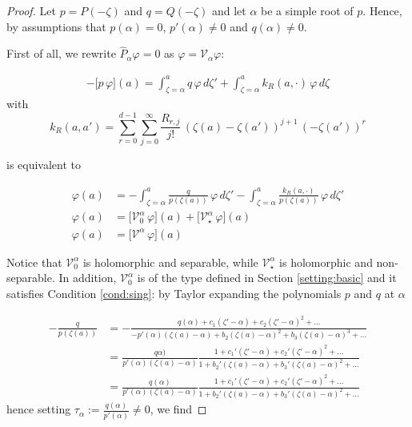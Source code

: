 \documentclass{article}
\theoremstyle{plain}
\newcommand{\singexp}[2]{\mathcal{H}L^\infty_{#1, #2}}
\newcommand{\singexpalg}[1]{\singexp{#1}{\bullet}}
\newcommand{\volterra}{\mathcal{V}}
\newcommand{\hardpart}{\mathcal{V}_0}
\newcommand{\softpart}{\mathcal{V}_\star}
\begin{document}

\begin{proof}
Let $p = P(-\zeta)$ and $q = Q(-\zeta)$ and let $\alpha$ be a simple root of $p$. Hence, by assumptions that $p(\alpha)=0$, $p'(\alpha)\neq 0$ and $q(\alpha)\neq 0$. 

First of all, we rewrite $\hat{P}_{\alpha}\varphi=0$ as $\varphi = \volterra_\alpha \varphi $: %

\begin{align*}
    -\big[ p\, \varphi \big](a)= \int_{\zeta=\alpha}^a q  \, \varphi \, d\zeta' + \int_{\zeta=\alpha}^a k_R(a,\cdot)  \, \varphi \, d\zeta
\end{align*}
with \[k_R(a,a')=\sum_{r=0}^{d-1}\sum_{j=0}^\infty \frac{R_{r,j}}{j!} \, (\zeta(a)-\zeta(a'))^{j+1} \, (-\zeta(a'))^r\]  

is equivalent to 

\begin{align}
   \nonumber \varphi (a)& =-\int_{\zeta=\alpha}^a \frac{q}{p(\zeta(a))}  \, \varphi \, d\zeta' - \int_{\zeta=\alpha}^a \frac{k_R(a,\cdot)}{p(\zeta(a))}  \, \varphi \, d\zeta' \\
   \nonumber \varphi (a)& =\Big[ \hardpart^\alpha \, \varphi \Big](a)+ \Big[\softpart^\alpha \, \varphi\Big](a) \\
   \varphi(a) &=\Big[ \volterra^\alpha \, \varphi \Big](a)
\end{align}

Notice that $\hardpart^\alpha$ is holomorphic and separable, while $\softpart^\alpha$ is holomorphic and non-separable. In addition, $\hardpart^\alpha$ is of the type defined in Section \ref{setting:basic} and it satisfies Condition \eqref{cond:sing}: by Taylor expanding the polynomials $p$ and $q$ at $\alpha$

\begin{align*}
    -\frac{q}{p(\zeta(a))}&=-\frac{q(\alpha)+c_1(\zeta'-\alpha)+c_2 (\zeta'-\alpha)^2+...}{-p'(\alpha)(\zeta(a)-\alpha)+ b_2 (\zeta(a)-\alpha)^2+b_3(\zeta(a)-\alpha)^3+...}\\
    &=\frac{q\alpha)}{p'(\alpha)(\zeta(a)-\alpha)}\frac{1+c_1'(\zeta'-\alpha)+c_2' (\zeta'-\alpha)^2+...}{1+ b_2' (\zeta(a)-\alpha)+b_3'(\zeta(a)-\alpha)^2+...}\\
    &=\frac{q(\alpha)}{p'(\alpha)(\zeta(a)-\alpha)}\frac{1+c_1'(\zeta'-\alpha)+c_2' (\zeta'-\alpha)^2+...}{1+b_2' (\zeta(a)-\alpha)+b_3'(\zeta(a)-\alpha)^2+...}
\end{align*}
hence setting $\tau_\alpha:=\frac{q(\alpha)}{p'(\alpha)}\neq 0$, we find


\end{proof}
\end{document}
